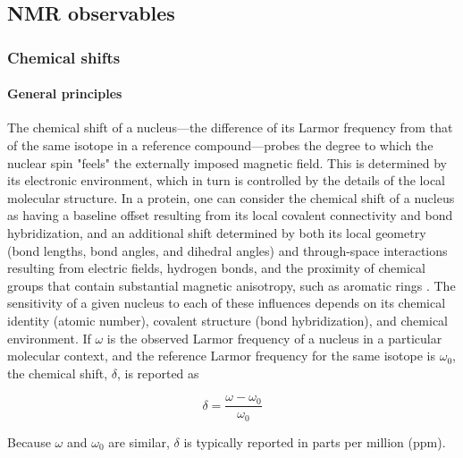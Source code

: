 \documentclass[9pt,review]{livecoms}
\begin{document}
\subsection{NMR observables}
\label{sub:nmr_obs}

\subsubsection{Chemical shifts}
\label{sub2:chem_shift}

\paragraph{General principles}

The chemical shift of a nucleus---the difference of its Larmor frequency from that of the same isotope in a reference compound---probes the degree to which the nuclear spin "feels" the externally imposed magnetic field.
This is determined by its electronic environment, which in turn is controlled by the details of the local molecular structure.
In a protein, one can consider the chemical shift of a nucleus as having a baseline offset resulting from its local covalent connectivity and bond hybridization, and an additional shift determined by both its local geometry (bond lengths, bond angles, and dihedral angles) and through-space interactions resulting from electric fields, hydrogen bonds, and the proximity of chemical groups that contain substantial magnetic anisotropy, such as aromatic rings \cite{wishart_12_1994,wishart_1_2002,neal_rapid_2003}.
The sensitivity of a given nucleus to each of these influences depends on its chemical identity (atomic number), covalent structure (bond hybridization), and chemical environment.
If $\omega$ is the observed Larmor frequency of a nucleus in a particular molecular context, and the reference Larmor frequency for the same isotope is $\omega_0$, the chemical shift, $\delta$, is reported as

\begin{equation}
\label{eqn:chem_shift}
\delta = \frac {\omega - \omega_0} {\omega_0}
\end{equation}

\noindent Because $\omega$ and $\omega_0$ are similar, $\delta$ is typically reported in parts per million (ppm).
\end{document}
